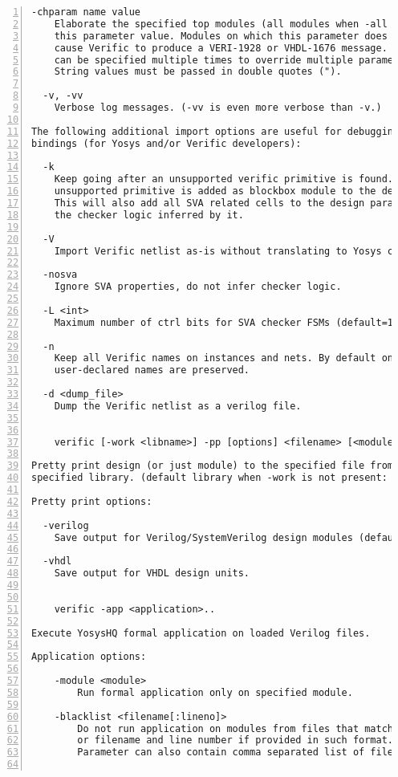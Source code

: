 \begin{lstlisting}[numbers=left,frame=single]
  -chparam name value 
    Elaborate the specified top modules (all modules when -all given) using
    this parameter value. Modules on which this parameter does not exist will
    cause Verific to produce a VERI-1928 or VHDL-1676 message. This option
    can be specified multiple times to override multiple parameters.
    String values must be passed in double quotes (").

  -v, -vv
    Verbose log messages. (-vv is even more verbose than -v.)

The following additional import options are useful for debugging the Verific
bindings (for Yosys and/or Verific developers):

  -k
    Keep going after an unsupported verific primitive is found. The
    unsupported primitive is added as blockbox module to the design.
    This will also add all SVA related cells to the design parallel to
    the checker logic inferred by it.

  -V
    Import Verific netlist as-is without translating to Yosys cell types. 

  -nosva
    Ignore SVA properties, do not infer checker logic.

  -L <int>
    Maximum number of ctrl bits for SVA checker FSMs (default=16).

  -n
    Keep all Verific names on instances and nets. By default only
    user-declared names are preserved.

  -d <dump_file>
    Dump the Verific netlist as a verilog file.


    verific [-work <libname>] -pp [options] <filename> [<module>]..

Pretty print design (or just module) to the specified file from the
specified library. (default library when -work is not present: "work")

Pretty print options:

  -verilog
    Save output for Verilog/SystemVerilog design modules (default).

  -vhdl
    Save output for VHDL design units.


    verific -app <application>..

Execute YosysHQ formal application on loaded Verilog files.

Application options:

    -module <module>
        Run formal application only on specified module.

    -blacklist <filename[:lineno]>
        Do not run application on modules from files that match the filename
        or filename and line number if provided in such format.
        Parameter can also contain comma separated list of file locations.


\end{lstlisting}
